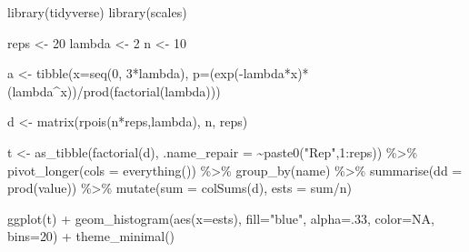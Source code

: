 \documentclass[
  letterpaper,
]{book}
\newenvironment{Shaded}{\begin{snugshade}}{\end{snugshade}}
\newcommand{\AttributeTok}[1]{\textcolor[rgb]{0.40,0.45,0.13}{#1}}
\newcommand{\ConstantTok}[1]{\textcolor[rgb]{0.56,0.35,0.01}{#1}}
\newcommand{\DecValTok}[1]{\textcolor[rgb]{0.68,0.00,0.00}{#1}}
\newcommand{\FunctionTok}[1]{\textcolor[rgb]{0.28,0.35,0.67}{#1}}
\newcommand{\NormalTok}[1]{\textcolor[rgb]{0.00,0.23,0.31}{#1}}
\newcommand{\OtherTok}[1]{\textcolor[rgb]{0.00,0.23,0.31}{#1}}
\newcommand{\SpecialCharTok}[1]{\textcolor[rgb]{0.37,0.37,0.37}{#1}}
\newcommand{\StringTok}[1]{\textcolor[rgb]{0.13,0.47,0.30}{#1}}
\begin{document}
\begin{Shaded}
\begin{Highlighting}[]
\FunctionTok{library}\NormalTok{(tidyverse)}
\FunctionTok{library}\NormalTok{(scales)}

\NormalTok{reps   }\OtherTok{\textless{}{-}} \DecValTok{20}
\NormalTok{lambda }\OtherTok{\textless{}{-}} \DecValTok{2}
\NormalTok{n      }\OtherTok{\textless{}{-}} \DecValTok{10}

\NormalTok{a }\OtherTok{\textless{}{-}} \FunctionTok{tibble}\NormalTok{(}\AttributeTok{x=}\FunctionTok{seq}\NormalTok{(}\DecValTok{0}\NormalTok{, }\DecValTok{3}\SpecialCharTok{*}\NormalTok{lambda),}
            \AttributeTok{p=}\NormalTok{(}\FunctionTok{exp}\NormalTok{(}\SpecialCharTok{{-}}\NormalTok{lambda}\SpecialCharTok{*}\NormalTok{x)}\SpecialCharTok{*}\NormalTok{(lambda}\SpecialCharTok{\^{}}\NormalTok{x))}\SpecialCharTok{/}\FunctionTok{prod}\NormalTok{(}\FunctionTok{factorial}\NormalTok{(lambda)))}

\NormalTok{d }\OtherTok{\textless{}{-}} \FunctionTok{matrix}\NormalTok{(}\FunctionTok{rpois}\NormalTok{(n}\SpecialCharTok{*}\NormalTok{reps,lambda), n, reps)}

\NormalTok{t }\OtherTok{\textless{}{-}} \FunctionTok{as\_tibble}\NormalTok{(}\FunctionTok{factorial}\NormalTok{(d), }\AttributeTok{.name\_repair =} \SpecialCharTok{\textasciitilde{}}\FunctionTok{paste0}\NormalTok{(}\StringTok{"Rep"}\NormalTok{,}\DecValTok{1}\SpecialCharTok{:}\NormalTok{reps)) }\SpecialCharTok{\%\textgreater{}\%}
  \FunctionTok{pivot\_longer}\NormalTok{(}\AttributeTok{cols =} \FunctionTok{everything}\NormalTok{()) }\SpecialCharTok{\%\textgreater{}\%}
  \FunctionTok{group\_by}\NormalTok{(name) }\SpecialCharTok{\%\textgreater{}\%}
  \FunctionTok{summarise}\NormalTok{(}\AttributeTok{dd =} \FunctionTok{prod}\NormalTok{(value)) }\SpecialCharTok{\%\textgreater{}\%}
  \FunctionTok{mutate}\NormalTok{(}\AttributeTok{sum  =} \FunctionTok{colSums}\NormalTok{(d),}
         \AttributeTok{ests =}\NormalTok{ sum}\SpecialCharTok{/}\NormalTok{n)}
\end{Highlighting}
\end{Shaded}

\begin{Shaded}
\begin{Highlighting}[]
\FunctionTok{ggplot}\NormalTok{(t) }\SpecialCharTok{+} 
  \FunctionTok{geom\_histogram}\NormalTok{(}\FunctionTok{aes}\NormalTok{(}\AttributeTok{x=}\NormalTok{ests), }\AttributeTok{fill=}\StringTok{"blue"}\NormalTok{, }\AttributeTok{alpha=}\NormalTok{.}\DecValTok{33}\NormalTok{, }\AttributeTok{color=}\ConstantTok{NA}\NormalTok{, }\AttributeTok{bins=}\DecValTok{20}\NormalTok{) }\SpecialCharTok{+}
  \FunctionTok{theme\_minimal}\NormalTok{()}
\end{Highlighting}
\end{Shaded}
\end{document}

